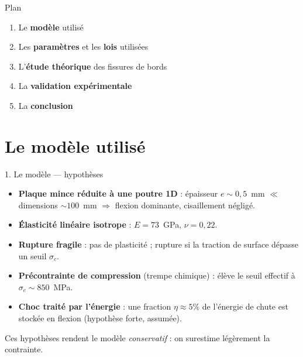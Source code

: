 \documentclass[11pt,aspectratio=169]{beamer}
\begin{document}
\begin{frame}{Plan}
  \vfill
  \Large
  \begin{enumerate}[leftmargin=2.4em,itemsep=12pt,
                    label=\textcolor{verre}{\bfseries\arabic*.}]
    \item Le \textbf{modèle} utilisé
    \item Les \textbf{paramètres} et les \textbf{lois} utilisées
    \item L'\textbf{étude théorique} des fissures de bords
    \item La \textbf{validation expérimentale}
    \item La \textbf{conclusion}
  \end{enumerate}
  \vfill
\end{frame}


\section{Le modèle utilisé}
\begin{frame}{1. Le modèle --- hypothèses}
  \footnotesize
  \begin{itemize}
    \item \textbf{Plaque mince réduite à une poutre 1D} : épaisseur
          $e\sim 0{,}5$~mm $\ll$ dimensions $\sim 100$~mm $\Rightarrow$ flexion
          dominante, cisaillement négligé.
    \item \textbf{Élasticité linéaire isotrope} : $E=73$~GPa, $\nu=0{,}22$.
    \item \textbf{Rupture fragile} : pas de plasticité ; rupture si la traction
          de surface dépasse un seuil $\sigma_c$.
    \item \textbf{Précontrainte de compression} (trempe chimique) : élève le
          seuil effectif à $\sigma_c\sim 850$~MPa.
    \item \textbf{Choc traité par l'énergie} : une fraction $\eta\approx 5\%$ de
          l'énergie de chute est stockée en flexion (hypothèse forte, assumée).
  \end{itemize}
  \vspace{2pt}
  \centering\scriptsize\textcolor{danger}{Ces hypothèses rendent le modèle
  \emph{conservatif} : on surestime légèrement la contrainte.}
\end{frame}
\end{document}
